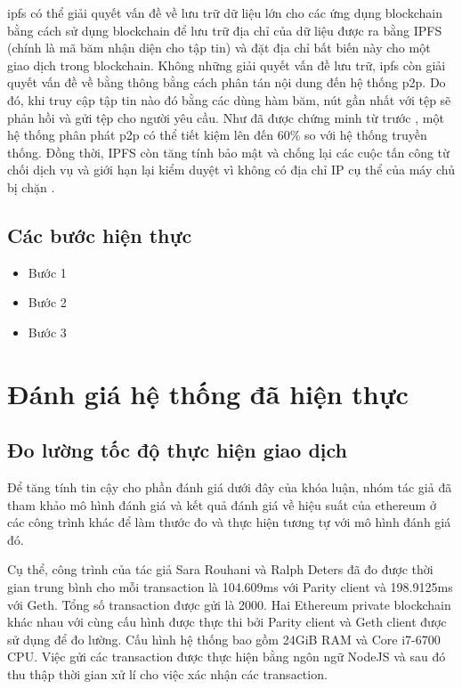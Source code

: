 \documentclass[../main-report.tex]{subfiles}
\begin{document}
\acrshort{ipfs} có thể giải quyết vấn đề về lưu trữ dữ liệu lớn cho các ứng dụng \gls{blockchain} bằng cách sử dụng blockchain để lưu trữ địa chỉ của dữ liệu được ra bằng IPFS (chính là mã băm nhận diện cho tập tin) và đặt địa chỉ bất biến này cho một giao dịch trong blockchain. Không những giải quyết vấn đề lưu trữ, \acrshort{ipfs} còn giải quyết vấn đề về bằng thông bằng cách phân tán nội dung đến hệ thống \acrshort{p2p}. Do đó, khi truy cập tập tin nào đó bằng các dùng hàm băm, nút gần nhất với tệp sẽ phản hồi và gửi tệp cho người yêu cầu. Như đã được chứng minh từ trước \cite{5235364}, một hệ thống phân phát \acrshort{p2p} có thể tiết kiệm lên đến 60\% so với hệ thống truyền thống. Đồng thời, IPFS còn tăng tính bảo mật và chống lại các cuộc tấn công từ chối dịch vụ và giới hạn lại kiểm duyệt vì không có địa chỉ IP cụ thể của máy chủ bị chặn \cite{8441990}.
\subsection{Các bước hiện thực}
\begin{itemize}
\item Bước 1
\item Bước 2
\item Bước 3
\end{itemize}

\section{Đánh giá hệ thống đã hiện thực}
\subsection{Đo lường tốc độ thực hiện giao dịch}
Để tăng tính tin cậy cho phần đánh giá dưới đây của khóa luận, nhóm tác giả đã tham khảo mô hình đánh giá và kết quả đánh giá về hiệu suất của ethereum ở các công trình khác để làm thước đo và thực hiện tương tự với mô hình đánh giá đó.

Cụ thể, công trình của tác giả Sara Rouhani và Ralph Deters \cite{rouhani2017performance} đã đo được thời gian trung bình cho mỗi \gls{transaction} là 104.609ms với Parity client và 198.9125ms với Geth. Tổng số \gls{transaction} được gửi là 2000. Hai Ethereum private \gls{blockchain} khác nhau với cùng cấu hình được thực thi bởi Parity client và Geth client được sử dụng để đo lường. Cấu hình hệ thống bao gồm 24GiB RAM và Core i7-6700 CPU. Việc gửi các \gls{transaction} được thực hiện bằng ngôn ngữ NodeJS và sau đó thu thập thời gian xử lí cho việc xác nhận các \gls{transaction}.
\end{document}
